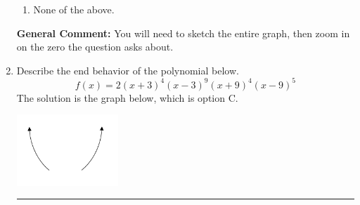 \documentclass{extbook}[14pt]
\newcommand{\litem}[1]{\item #1

\rule{\textwidth}{0.4pt}}
\begin{document}
\begin{enumerate}
{\begin{enumerate}[label=\Alph*.]
\item None of the above.\end{enumerate}
\textbf{General Comment:} You will need to sketch the entire graph, then zoom in on the zero the question asks about.
}
\litem{
Describe the end behavior of the polynomial below.
\[ f(x) = 2(x + 3)^{4}(x - 3)^{9}(x + 9)^{4}(x - 9)^{5} \]The solution is the graph below, which is option C.
\begin{center}
    \includegraphics[width=0.3\textwidth]{../Figures/polyEndBehaviorCopyCB.png}

\end{center}}
\end{enumerate}
\end{document}
